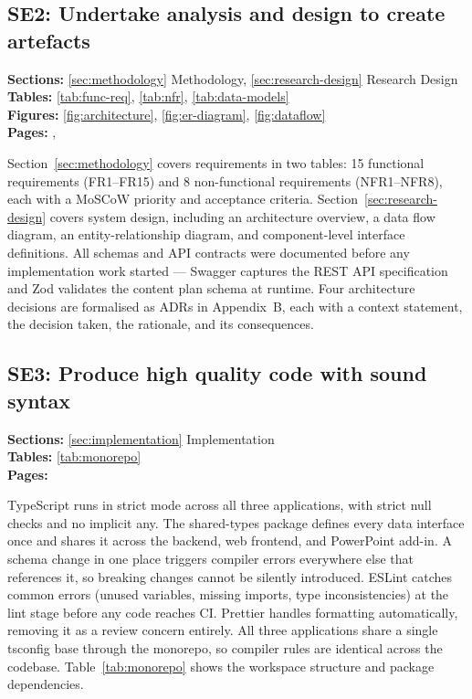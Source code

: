 \subsection*{SE2: Undertake analysis and design to create artefacts}

\noindent\textbf{Sections:} \ref{sec:methodology} Methodology, \ref{sec:research-design} Research Design\\
\noindent\textbf{Tables:} \ref{tab:func-req}, \ref{tab:nfr}, \ref{tab:data-models}\\
\noindent\textbf{Figures:} \ref{fig:architecture}, \ref{fig:er-diagram}, \ref{fig:dataflow}\\
\noindent\textbf{Pages:} \pageref{sec:methodology}, \pageref{sec:research-design}

Section~\ref{sec:methodology} covers requirements in two tables: 15 functional requirements (FR1--FR15) and 8 non-functional requirements (NFR1--NFR8), each with a MoSCoW priority and acceptance criteria. Section~\ref{sec:research-design} covers system design, including an architecture overview, a data flow diagram, an entity-relationship diagram, and component-level interface definitions. All schemas and API contracts were documented before any implementation work started — Swagger captures the REST API specification and Zod validates the content plan schema at runtime. Four architecture decisions are formalised as ADRs in Appendix~B, each with a context statement, the decision taken, the rationale, and its consequences.

\subsection*{SE3: Produce high quality code with sound syntax}

\noindent\textbf{Sections:} \ref{sec:implementation} Implementation\\
\noindent\textbf{Tables:} \ref{tab:monorepo}\\
\noindent\textbf{Pages:} \pageref{sec:implementation}

TypeScript runs in strict mode across all three applications, with strict null checks and no implicit any. The shared-types package defines every data interface once and shares it across the backend, web frontend, and PowerPoint add-in. A schema change in one place triggers compiler errors everywhere else that references it, so breaking changes cannot be silently introduced. ESLint catches common errors (unused variables, missing imports, type inconsistencies) at the lint stage before any code reaches CI. Prettier handles formatting automatically, removing it as a review concern entirely. All three applications share a single tsconfig base through the monorepo, so compiler rules are identical across the codebase. Table~\ref{tab:monorepo} shows the workspace structure and package dependencies.

